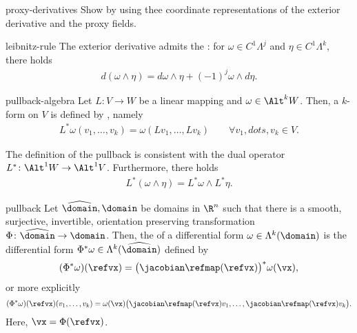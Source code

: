 \begin{Problem}{proxy-derivatives}
  Show  by using thee coordinate
  representations of the exterior derivative and the proxy fields.
\end{Problem}

\begin{Lemma}{leibnitz-rule}
  The exterior derivative admits the : for
  $\omega\in C^1\Lambda^j$ and $\eta\in C^1\Lambda^k$, there holds
  \begin{gather}
    d(\omega\wedge\eta) = d\omega\wedge\eta + (-1)^j\omega\wedge d\eta.
  \end{gather}
\end{Lemma}

\begin{Definition}{pullback-algebra}
  Let $L\colon V\to W$ be a linear mapping and $\omega \in \Alt^k
  W$. Then, a $k$-form on $V$ is defined by , namely
  \begin{gather}
    L^* \omega(v_1,\dots,v_k) = \omega(Lv_1,\dots,Lv_k)
    \qquad\forall v_1,dots,v_k\in V.
  \end{gather}
\end{Definition}

\begin{remark}
  The definition of the pullback is consistent with the dual
  operator $L^*\colon \Alt^1 W \to \Alt^1 V$. Furthermore, there holds
  \begin{gather}
    L^*(\omega\wedge\eta) = L^*\omega \wedge L^*\eta.
  \end{gather}
\end{remark}

\begin{Definition}{pullback}
  Let $\widehat\domain,\domain$ be domains in $\R^n$ such that there is a
  smooth, surjective, invertible, orientation preserving transformation
  $\Phi\colon \widehat\domain \to \domain$. Then, the  of a
  differential form $\omega \in\Lambda^k(\domain)$ is the
  differential form $\Phi^*\omega \in \Lambda^k(\widehat\domain)$ defined by
  \begin{gather}
    (\Phi^*\omega)(\refvx) = \bigl(\jacobian\refmap(\refvx)\bigr)^*\omega(\vx),
  \end{gather}
  or more explicitly
  \begin{gather}
    (\Phi^*\omega)(\refvx)(v_1,\dots,v_k)
    = \omega(\vx)\bigl(\jacobian\refmap(\refvx)v_1,\dots,\jacobian\refmap(\refvx)v_k\bigr).
  \end{gather}
  Here, $\vx = \Phi(\refvx)$.
\end{Definition}

